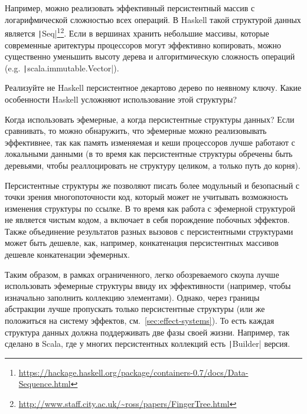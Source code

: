 Например, можно реализовать эффективный персистентный массив с логарифмической сложностью всех операций.
В Haskell такой структурой данных является \texttt|Seq|\footnote{\url{https://hackage.haskell.org/package/containers-0.7/docs/Data-Sequence.html}}\footnote{\url{http://www.staff.city.ac.uk/~ross/papers/FingerTree.html}}.
Если в вершинах хранить небольшие массивы, которые современные аритектуры процессоров могут эффективно копировать, можно существенно уменьшить высоту дерева и алгоритмическую сложность операций (e.g. \texttt|scala.immutable.Vector|).

\begin{task}
    Реализуйте не Haskell персистентное декартово дерево по неявному ключу.
    Какие особенности Haskell усложняют использование этой структуры?
\end{task}

Когда использовать эфемерные, а когда персистентные структуры данных?
Если сравнивать, то можно обнаружить, что эфемерные можно реализовывать эффективнее, так как память изменяемая и кеши процессоров лучше работают с локальными данными (в то время как персистентные структуры обречены быть деревьями, чтобы реаллоцировать не структуру целиком, а только путь до корня).

Персистентные структуры же позволяют писать более модульный и безопасный с точки зрения многопоточности код, который может не учитывать возможность изменения структуры по ссылке.
В то время как работа с эфемерной структурой не является чистым кодом, а включает в себя порождение побочных эффектов.
Также объединение результатов разных вызовов с персистентными структурами может быть дешевле, как, например, конкатенация персистентных массивов дешевле конкатенации эфемерных.

Таким образом, в рамках ограниченного, легко обозреваемого скоупа лучше использовать эфемерные структуры ввиду их эффективности (например, чтобы изначально заполнить коллекцию элементами).
Однако, через границы абстракции лучше пропускать только персистентные структуры (или же положиться на систему эффектов, см.~\ref{sec:effect-systems}).
То есть каждая структура данных должна поддерживать две фазы своей жизни.
Например, так сделано в Scala, где у многих персистентных коллекций есть \texttt|Builder| версия.










